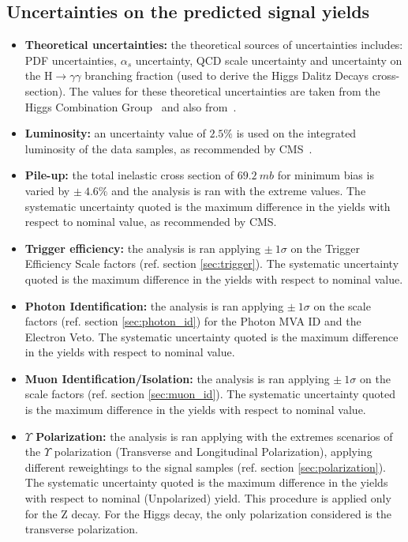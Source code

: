 \subsection{Uncertainties on the predicted signal yields}
\begin{itemize} 
\item \textbf{Theoretical uncertainties:} the theoretical sources of uncertainties includes: PDF uncertainties, $\alpha_{s}$ uncertainty, QCD scale uncertainty and uncertainty on the $\mathrm{H} \to \gamma\gamma$ branching fraction (used to derive the Higgs Dalitz Decays cross-section). The values for these theoretical uncertainties are taken from the Higgs Combination Group~\cite{CERNYellowReportPageAt13TeV} and also from~\cite{Passarino:2013nka}.

\item \textbf{Luminosity:} an uncertainty value of $2.5\%$ is used on the integrated luminosity of the data samples, as recommended by CMS~\cite{CMS-PAS-LUM-17-001}.

\item \textbf{Pile-up:} the total inelastic cross section of $69.2~mb$ for minimum bias is varied by $\pm~4.6\%$ and the analysis is ran with the extreme values. The systematic uncertainty quoted is the maximum difference in the yields with respect to nominal value, as recommended by CMS. 

\item \textbf{Trigger efficiency:} the analysis is ran applying $\pm~1\sigma$ on the Trigger Efficiency Scale factors (ref. section \ref{sec:trigger}). The systematic uncertainty quoted is the maximum difference in the yields with respect to nominal value.

\item \textbf{Photon Identification:} the analysis is ran applying $\pm~1\sigma$ on the scale factors (ref. section \ref{sec:photon_id}) for the Photon MVA ID and the Electron Veto. The systematic uncertainty quoted is the maximum difference in the yields with respect to nominal value.

\item \textbf{Muon Identification/Isolation:} the analysis is ran applying $\pm~1\sigma$ on the scale factors (ref. section \ref{sec:muon_id}). The systematic uncertainty quoted is the maximum difference in the yields with respect to nominal value.

\item \textbf{$\Upsilon$ Polarization:} the analysis is ran applying with the extremes scenarios of the $\Upsilon$ polarization (Transverse and Longitudinal Polarization), applying different reweightings to the signal samples (ref. section \ref{sec:polarization}). The systematic uncertainty quoted is the maximum difference in the yields with respect to nominal (Unpolarized) yield. This procedure is applied only for the Z decay. For the Higgs decay, the only polarization considered is the transverse polarization.

\end{itemize}


